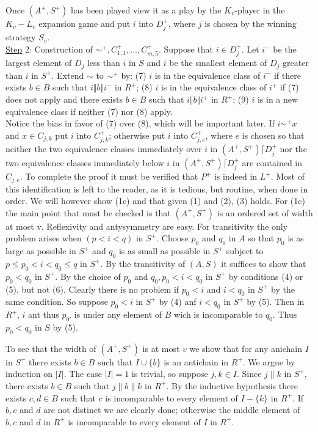 \documentclass[twoside]{article}
\begin{document}
Once $(A^+,S^+)$   has been played view it as a play by the   $K_v$-player in the $K_v-L_v$ expansion game and put   $i$ into   $D_j^+$, where   $j$    is   chosen by the winning strategy $S_v$.\\
\newline
\underline{Step} 2:   Construction of  $\sim^+, C_{1,1}^+,...,C_{m,5}^+$.  Suppose that $i\in D_j^+$.   Let   $i^-$ be
the largest element of   $D_j$    less than   $i$ in   $S$     and   $i$     be the smallest
element of	$D_j$ greater than   $i$   in   $S^+$.   Extend  $\sim$   to  $\sim^+$ by:
(7) $i$    is	in the equivalence class of   $i^-$   if there   exists   $b \in B$ such
that	$i\Vert b\Vert i^-$   in $R^+$;
(8) $i$    is	in the equivalence class of   $i^+$   if   (7)   does not apply and
there	exists   $b \in B$   such that $i\Vert b\Vert i^+$   in $R^+$;
(9) $i$   is	in a new equivalence class if neither (7) nor   (8) apply.\\


Notice the bias in favor of   (7)   over   (8), which will be important
later.    If   $i\sim^+ x$   and   $x\in C_{j,k}$   put   $i$ into   $C_{j,k}^+$;   otherwise put   $i$ into
$C_{j,e}^+$, where	$e$ is chosen so that neither the two equivalence classes
immediately	over   $i$   in   $(A^+,S^+)\lceil D_{j}^+$ nor the two equivalence classes
immediately	below   $i$   in   $(A^+,S^+)\lceil D_j^+$  are contained in   $C_{j,e}$.
%
%
To complete the proof it must be verified that $P^+$ is indeed in $L^+$.
Most of this identification is left to the reader, as it is tedious, but routine, when done in order. We will however show (1c)
and that given (1) and (2), (3) holds. For (1c) the main point that must be checked is that $(A^+, S^+)$ is an ordered set of width at most v.
Reflexivity and antysymmetry are easy. For transitivity the only problem arises when $(p < i < q)$ in $S^+$.
Choose $p_0$ and $q_0$ in $A$ so that $p_0$ is as large as possible in $S^+$ and $q_0$ is as small as possible in $S^+$ subject to
$p \leq p_0 < i < q_0 \leq q$ in $S^+$. By the transitivity of $(A,S)$ it suffices to show that $p_0 < q_0$ in $S^+$. By the choice of 
$p_0$ and $q_0, p_0 <i <q_0$ in $S^+$ by conditions (4) or (5), but not (6). Clearly there is no problem if $p_0 < i$ and $i < q_0$ in $S^+$
by the same condition. So suppose $p_0 <i$ in $S^+$ by (4) anf $i < q_0$ in $S^+$ by (5). Then in $R^+$, $i$ ant thus $p_{0'}$ is under any
element of $B$ wich is incomparable to $q_0$. Thus $p_0<q_0$ in $S$ by (5).

To see that the width of $(A^+, S^+)$ is at most $v$ we show that for any anichain $I$ in $S^+$ there exists $b \in B$ such that $I \cup \{b\}$
is an antichain in $R^+$. We argue by induction on $|I|$. The case $|I| = 1$ is trivial, so suppose $j,k \in I$. Since $j\parallel k$ in $S^+$,
there exists $b \in B$ such that $j \parallel b \parallel k$ in $R^+$. By the inductive hypothesis there exists $c,d \in B$ such that $c$ is 
incomparable to every element of $I-\{k\}$ in $R^+$. If $b,c$ and $d$ are not distinct we are clearly done; otherwise the middle element
of $b,c$ and $d$ in $R^+$ is incomparable to every element of $I$ in $R^+$.
\end{document}
